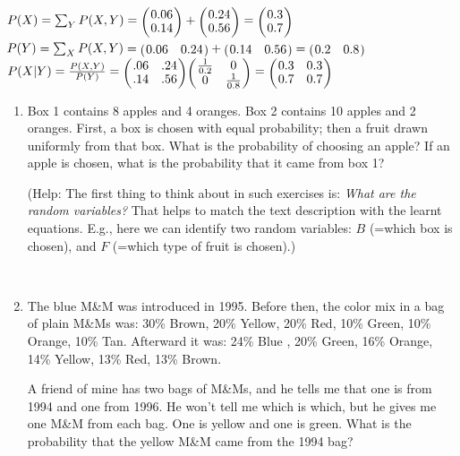 \begin{solution}
$P(X) = \sum_Y P(X, Y) = \mat{c}{ 0.06 \\ 0.14} + \mat{c}{ 0.24 \\ 0.56} = \mat{c}{ 0.3 \\ 0.7}$ \\
$P(Y) = \sum_X P(X, Y)  = \mat{cc}{ 0.06 & 0.24} + \mat{cc}{ 0.14 & 0.56} =  \mat{cc}{ 0.2 & 0.8}$ \\
$P(X|Y) = \frac{P(X,Y)}{P(Y)} = \mat{cc}{ .06 & .24 \\ .14 & .56} \mat{cc}{ \frac{1}{0.2} & 0 \\ 0 & \frac{1}{0.8}} = \mat{cc}{ 0.3 & 0.3 \\ 0.7 & 0.7}  $

\end{solution}


\begin{enumerate}
\item Box 1 contains 8 apples and 4 oranges. Box 2 contains 10 apples and 2
oranges. First, a box is chosen with equal probability; then a fruit drawn uniformly from that box. What is the
probability of choosing an apple? If an apple is chosen, what is the
probability that it came from box 1?

{\small (Help: The first thing to think about in such exercises is: \emph{What are the random variables?} That helps to match the text description with the learnt equations. E.g., here we can identify two random variables: $B$ (=which box is chosen), and $F$ (=which type of fruit is chosen).)

}

~

\item The blue M\&M was introduced in 1995.
Before then, the color mix in a bag of plain M\&Ms was:
30\% Brown, 20\% Yellow, 20\% Red, 10\% Green, 10\% Orange, 10\% Tan.
Afterward it was: 24\% Blue , 20\% Green, 16\% Orange, 14\% Yellow, 13\% Red,
13\% Brown.

A friend of mine has two bags of M\&Ms, and he tells me that one is from
1994 and one from 1996.  He won't tell me which is which, but he gives me
one M\&M from each bag.  One is yellow and one is green.  What is the
probability that the yellow M\&M came from the 1994 bag?
\end{enumerate}

